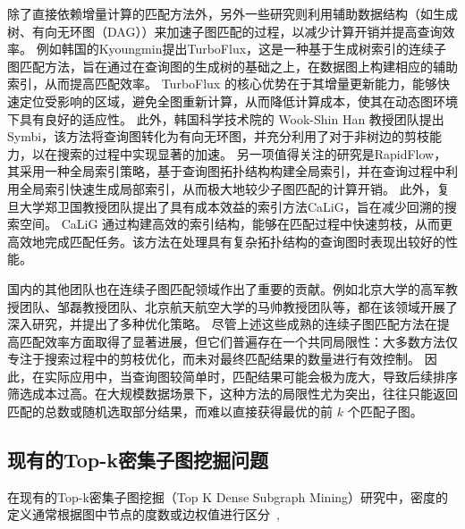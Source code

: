 除了直接依赖增量计算的匹配方法外，另外一些研究则利用辅助数据结构（如生成树、有向无环图（DAG））来加速子图匹配的过程，以减少计算开销并提高查询效率。
例如韩国的Kyoungmin提出TurboFlux\cite{csm-turboflux-DBLP:conf/sigmod/KimSHLHCSJ18}，这是一种基于生成树索引的连续子图匹配方法，旨在通过在查询图的生成树的基础之上，在数据图上构建相应的辅助索引，从而提高匹配效率。
TurboFlux 的核心优势在于其增量更新能力，能够快速定位受影响的区域，避免全图重新计算，从而降低计算成本，使其在动态图环境下具有良好的适应性。
此外，韩国科学技术院的 Wook-Shin Han 教授团队提出Symbi\cite{csm-symbi-DBLP:journals/pvldb/MinPPGIH21}，该方法将查询图转化为有向无环图，并充分利用了对于非树边的剪枝能力，以在搜索的过程中实现显著的加速。
另一项值得关注的研究是RapidFlow\cite{csm-rapidflow-DBLP:journals/pvldb/SunSHL22}，其采用一种全局索引策略，基于查询图拓扑结构构建全局索引，并在查询过程中利用全局索引快速生成局部索引，从而极大地较少子图匹配的计算开销。
此外，复旦大学郑卫国教授团队提出了具有成本效益的索引方法CaLiG\cite{csm-calig-DBLP:journals/pacmmod/YangZZY23}，旨在减少回溯的搜索空间。
CaLiG 通过构建高效的索引结构，能够在匹配过程中快速剪枝，从而更高效地完成匹配任务。该方法在处理具有复杂拓扑结构的查询图时表现出较好的性能。

国内的其他团队也在连续子图匹配领域作出了重要的贡献。例如北京大学的高军教授团队、邹磊教授团队、北京航天航空大学的马帅教授团队等，都在该领域开展了深入研究，并提出了多种优化策略。
尽管上述这些成熟的连续子图匹配方法在提高匹配效率方面取得了显著进展，但它们普遍存在一个共同局限性：大多数方法仅专注于搜索过程中的剪枝优化，而未对最终匹配结果的数量进行有效控制。
因此，在实际应用中，当查询图较简单时，匹配结果可能会极为庞大，导致后续排序筛选成本过高。在大规模数据场景下，这种方法的局限性尤为突出，往往只能返回匹配的总数或随机选取部分结果，而难以直接获得最优的前 $k$ 个匹配子图。
\subsection{现有的Top-k密集子图挖掘问题}
在现有的Top-k密集子图挖掘（Top K Dense Subgraph Mining）研究中，密度的定义通常根据图中节点的度数或边权值进行区分~\cite{dsm-noweight-Bahmani-DBLP:journals/pvldb/BahmaniKV12,dsm-noweight-Balalau-DBLP:conf/wsdm/BalalauBCGS15,dsm-noweight-Bonchi-DBLP:journals/corr/abs-2007-01533,dsm-noweight-Dondi-DBLP:journals/corr/abs-2002-07695,dsm-noweight-Fang-DBLP:journals/pvldb/FangYCLL19,dsm-noweight-Gabert-DBLP:conf/wsdm/GabertPC21,dsm-noweight-Hu-DBLP:conf/cikm/HuWC17,dsm-noweight-Ma-DBLP:journals/pvldb/MaCLH22,dsm-noweight-Mathieu-DBLP:journals/corr/abs-2010-07794,dsm-noweight-McGregor-DBLP:journals/corr/McGregorTVV15,dsm-noweight-Rozenshtein-DBLP:journals/tkdd/RozenshteinTG17,dsm-noweight-Saha-DBLP:journals/corr/abs-2212-08820,dsm-noweight-Tsourakakis-DBLP:conf/kdd/TsourakakisBGGT13,dsm-noweight-Valari-DBLP:conf/ssdbm/ValariKP12,dsm-noweight-Zhao-DBLP:conf/icalip/ZhaoQYB14,dsm-weight-Angel-DBLP:journals/vldb/AngelKSSST14,dsm-weight-Ma-DBLP:conf/icde/MaHWLH17,dsm-weight-Muhammad-DBLP:conf/cikm/NasirGMG17},

